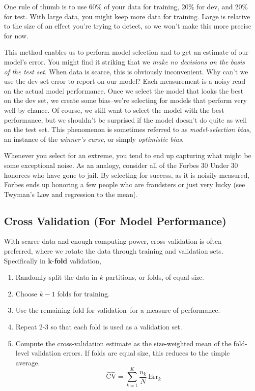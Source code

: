 One rule of thumb is to use 60\% of your data for training, 20\% for dev, and 20\% for test. With large data, you might keep more data for training. Large is relative to the size of an effect you're trying to detect, so we won't make this more precise for now.

This method enables us to perform model selection and to get an estimate of our model's error. You might find it striking that we \textit{make no decisions on the basis of the test set}. When data is scarce, this is obviously inconvenient. Why can't we use the dev set error to report on our model? Each measurement is a noisy read on the actual model performance. Once we select the model that looks the best on the dev set, we create some bias--we're selecting for models that perform very well by chance. Of course, we still want to select the model with the best performance, but we shouldn't be surprised if the model doesn't do quite as well on the test set. This phenomenon is sometimes referred to as \textit{model-selection bias}, an instance of the \textit{winner's curse}, or simply \textit{optimistic bias}.

Whenever you select for an extreme, you tend to end up capturing what might be some exceptional noise. As an analogy, consider all of the Forbes 30 Under 30 honorees who have gone to jail. By selecting for success, as it is noisily measured, Forbes ends up honoring a few people who are fraudsters or just very lucky (see Twyman's Law and regression to the mean).

\subsection{Cross Validation (For Model Performance)}

With scarce data and enough computing power, cross validation is often preferred, where we rotate the data through training and validation sets. Specifically in $\mathbf{k}$-\textbf{fold} validation,

\begin{enumerate}
\item Randomly split the data in $k$ partitions, or folds, of equal size.
\item Choose $k-1$ folds for training.
\item Use the remaining fold for validation--for a measure of performance.
\item Repeat 2-3 so that each fold is used as a validation set.
\item Compute the cross-validation estimate as the size-weighted mean of the fold-level validation errors. If folds are equal size, this reduces to the simple average.
\begin{equation}
\widehat{\mathrm{CV}}=\sum_{k=1}^K \frac{n_k}{N}\,\mathrm{Err}_k
\label{eq:cross-validation}
\end{equation}
\end{enumerate}

